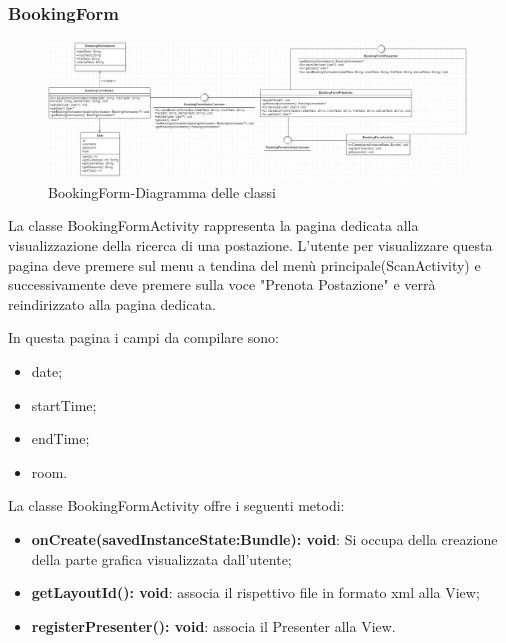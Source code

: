 \subsubsection{BookingForm}
\begin{figure}[H]
	\centering
	\includegraphics[width=16cm]{res/images/BookingForm.png}
	\caption{BookingForm-Diagramma delle classi}
	\label{fig:BookingForm-Diagramma delle classi}
\end{figure}
La classe BookingFormActivity rappresenta la pagina dedicata alla visualizzazione della ricerca di una postazione.
L'utente per visualizzare questa pagina deve premere sul menu a tendina del menù principale(ScanActivity) e successivamente deve premere sulla voce "Prenota Postazione" e verrà reindirizzato alla pagina dedicata.

In questa pagina i campi da compilare sono: 
\begin{itemize}
	\item date; 
	\item startTime; 
	\item endTime; 
	\item room.
	
\end{itemize}

La classe BookingFormActivity offre i seguenti metodi:
\begin{itemize}
	\item \textbf{onCreate(savedInstanceState:Bundle): void}: Si occupa della creazione della parte grafica visualizzata dall'utente; 
	\item \textbf{getLayoutId(): void}: associa il rispettivo file in formato xml alla View;
	\item \textbf{registerPresenter(): void}: associa il Presenter alla View. 
\end{itemize}


